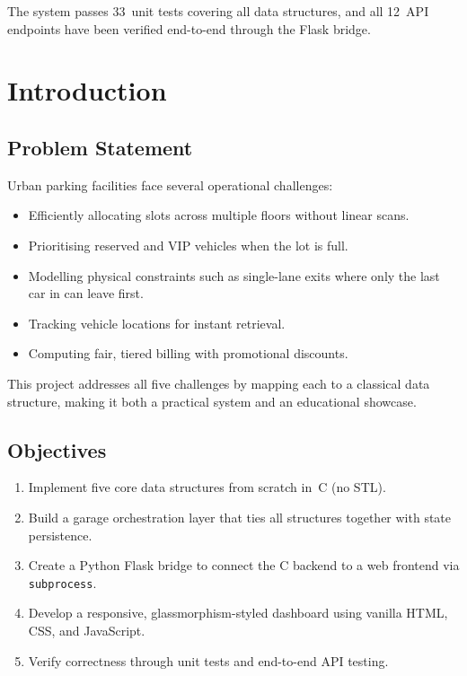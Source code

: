 \documentclass[12pt, a4paper]{report}
\begin{document}
The system passes 33~unit tests covering all data structures, and all
12~API endpoints have been verified end-to-end through the Flask
bridge.

\chapter{Introduction}

\section{Problem Statement}

Urban parking facilities face several operational challenges:
\begin{itemize}[nosep]
  \item Efficiently allocating slots across multiple floors without
        linear scans.
  \item Prioritising reserved and VIP vehicles when the lot is full.
  \item Modelling physical constraints such as single-lane exits where
        only the last car in can leave first.
  \item Tracking vehicle locations for instant retrieval.
  \item Computing fair, tiered billing with promotional discounts.
\end{itemize}

This project addresses all five challenges by mapping each to a
classical data structure, making it both a practical system and an
educational showcase.

\section{Objectives}

\begin{enumerate}[nosep]
  \item Implement five core data structures from scratch in~C (no STL).
  \item Build a garage orchestration layer that ties all structures
        together with state persistence.
  \item Create a Python Flask bridge to connect the C backend to a web
        frontend via \texttt{subprocess}.
  \item Develop a responsive, glassmorphism-styled dashboard using
        vanilla HTML, CSS, and JavaScript.
  \item Verify correctness through unit tests and end-to-end API testing.
\end{enumerate}
\end{document}
